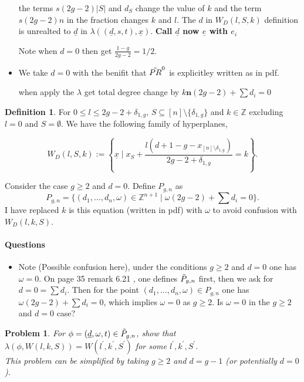 \documentclass[a4paper,12pt]{article}
\newtheorem{problem}{Problem}
\theoremstyle{definition}
\newtheorem{definition}{Definition}[section]
\theoremstyle{indented}
\newenvironment{titlemize}[1]{%
  \paragraph{#1}
  \begin{itemize}}
  {\end{itemize}}
\begin{document}
\begin{itemize}
the terms $s(2g-2)|S|$ and  $d_{S}$ change the value of $k$ and the term $s(2g-2) n$ in the fraction changes $k$ and $l$. The $d$ in $W_D(l,S,k)$ definition is unrealted to $\underline{d}$ in $\lambda((\underline{d},s,t), \underline{x})$. \textbf{Call $\underline{d}$ now $\underline{e}$ with $e_i$}

Note when $d=0$ then get $\frac{1-g}{2g-2} = 1/2$. 

\item We take $d=0$ with the benifit that $\Tilde{PR}^{0}$ is explicitley written as in pdf. 

when apply the $\lambda$ get total degree change by $k\textbf{n}(2g-2) +\sum d_i =0$ 


\end{itemize}





\hline 


\begin{definition}\label{planefam}  For $0\le l \le 2g-2 + \delta_{1,g}$, $S\subseteq [n] \setminus \{\delta_{1,g}\}$ and $k\in \mathbb{Z}$ excluding $l=0$ and $S=\emptyset$. We have the following family of hyperplanes,

$$W_D(l,S,k):= \left\{ \underline{x} \mid x_S + \frac{ l(d+1-g - x_{[n]\setminus{\delta_{1,g}} } ) } {2g-2+\delta_{1,g}} = k \right\}. $$
\end{definition}

Consider the case $g \ge 2$ and $d=0$. Define $P_{g,n}$ as $$P_{g,n}= \{(d_1,\dots,d_n,\omega ) \in \mathbb{Z}^{n+1} \mid \omega (2g-2) + \sum d_i=0\}.$$ I have replaced $k$ is this equation (written in pdf) with $\omega$ to avoid confusion with $W_D(l,k,S)$. 


\begin{titlemize}{Questions}

\item  
Note (Possible confusion here), under the conditions $g \ge 2$ and $d=0$ one has $\omega =0$. On page 35 remark 6.21 \cite{kass2019stability}, one defines $\Tilde{P}_{g,n}$ first, then we ask for $d=0=\sum d_i$. Then for the point $(d_1,\dots,d_n,\omega ) \in P_{g,n}$ one has $\omega (2g-2) + \sum d_i=0$, which implies $\omega =0$ as $g \ge 2$. Is $\omega =0$ in the $g \ge 2$ and $d=0$ case?


\end{titlemize}


\begin{problem}
For $\phi = (\underline{d},\omega,t) \in \Tilde{P}_{g,n}$, show that $\lambda(\phi, W(l,k,S))=W(l^{'} ,k^{'},S^{'})$ for some $l^{'} ,k^{'},S^{'}$.\\

This problem can be simplified by taking $g \ge 2$ and $d=g-1$ (or potentially $d=0$). 

\end{problem}
\end{document}

